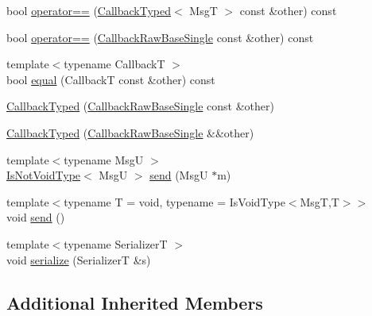 \begin{DoxyCompactItemize}
\item 
bool \hyperlink{structvt_1_1pipe_1_1callback_1_1cbunion_1_1_callback_typed_a6b88345f0d05d52a67730ffecaf68917}{operator==} (\hyperlink{structvt_1_1pipe_1_1callback_1_1cbunion_1_1_callback_typed}{Callback\+Typed}$<$ MsgT $>$ const \&other) const
\item 
bool \hyperlink{structvt_1_1pipe_1_1callback_1_1cbunion_1_1_callback_typed_a8ce2b5aa8087f7ff59e90c92d4d48c0f}{operator==} (\hyperlink{structvt_1_1pipe_1_1callback_1_1cbunion_1_1_callback_raw_base_single}{Callback\+Raw\+Base\+Single} const \&other) const
\item 
{\footnotesize template$<$typename CallbackT $>$ }\\bool \hyperlink{structvt_1_1pipe_1_1callback_1_1cbunion_1_1_callback_typed_a2c1b0eea2a4e14dc85a6ab889bd6a644}{equal} (CallbackT const \&other) const
\item 
\hyperlink{structvt_1_1pipe_1_1callback_1_1cbunion_1_1_callback_typed_a3cb4289b3d7353d03fcdfb6d7c52bb7a}{Callback\+Typed} (\hyperlink{structvt_1_1pipe_1_1callback_1_1cbunion_1_1_callback_raw_base_single}{Callback\+Raw\+Base\+Single} const \&other)
\item 
\hyperlink{structvt_1_1pipe_1_1callback_1_1cbunion_1_1_callback_typed_a51d3fdb7b8b73d077a76d79a52343794}{Callback\+Typed} (\hyperlink{structvt_1_1pipe_1_1callback_1_1cbunion_1_1_callback_raw_base_single}{Callback\+Raw\+Base\+Single} \&\&other)
\item 
{\footnotesize template$<$typename MsgU $>$ }\\\hyperlink{structvt_1_1pipe_1_1callback_1_1cbunion_1_1_callback_typed_a57e15e61b171c50bff2e7a0dd9078f46}{Is\+Not\+Void\+Type}$<$ MsgU $>$ \hyperlink{structvt_1_1pipe_1_1callback_1_1cbunion_1_1_callback_typed_afdbf535b3210a84aaaeae0b9b3edc35f}{send} (MsgU $\ast$m)
\item 
{\footnotesize template$<$typename T  = void, typename  = Is\+Void\+Type$<$\+Msg\+T,\+T$>$$>$ }\\void \hyperlink{structvt_1_1pipe_1_1callback_1_1cbunion_1_1_callback_typed_aa118972d857f12ec7433e01440b2dfd3}{send} ()
\item 
{\footnotesize template$<$typename SerializerT $>$ }\\void \hyperlink{structvt_1_1pipe_1_1callback_1_1cbunion_1_1_callback_typed_adf664b7850b5c89afd0abdac51bba0ed}{serialize} (SerializerT \&s)
\end{DoxyCompactItemize}
\subsection*{Additional Inherited Members}


